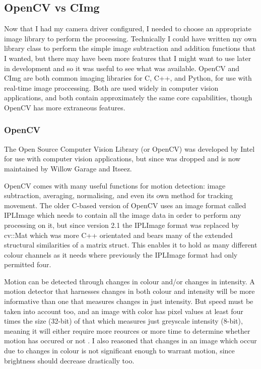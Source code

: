 \documentclass[11pt]{article} %
\begin{document}
\subsection{OpenCV vs CImg}
Now that I had my camera driver configured, I needed to choose an appropriate image library to perform the processing. Technically I could have written my own library class to perform the simple image subtraction and addition functions that I wanted, but there may have been more features that I might want to use later in development and so it was useful to see what was available. OpenCV and CImg are both common imaging libraries for C, C++, and Python, for use with real-time image proccessing.  Both are used widely in computer vision applications, and both contain approximately the same core capabilities, though OpenCV has more extraneous features.

\subsubsection{OpenCV}\label{opencvdocu}
The Open Source Computer Vision Library (or OpenCV) was developed by Intel for use with computer vision applications, but since was dropped and is now maintained by Willow Garage and Itseez.

OpenCV comes with many useful functions for motion detection: image subtraction, averaging, normalising, and even its own method for tracking movement. The older C-based version of OpenCV uses an image format called IPLImage which needs to contain all the image data in order to perform any processing on it, but since version 2.1 the IPLImage format was replaced by cv::Mat which was more C++ orientated and bears many of the extended structural similarities of a matrix struct. This enables it to hold as many different colour channels as it needs where previously the IPLImage format had only permitted four.

Motion can be detected through changes in colour and/or changes in intensity. A motion detector that harnesses changes in both colour and intensity will be more informative than one that measures changes in just intensity. But speed must be taken into account too, and an image with color has pixel values at least four times the size (32-bit) of that which measures just greyscale intensity (8-bit), meaning it will either require more reources or more time to determine whether motion has occured or not . I also reasoned that changes in an image which occur due to changes in colour is not significant enough to warrant motion, since brightness should decrease drastically too.
\end{document}
